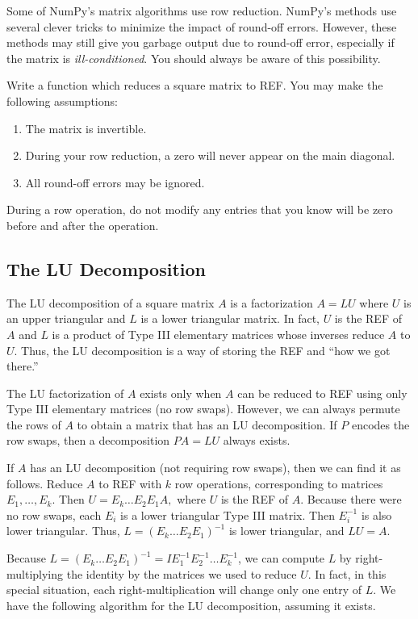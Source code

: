 Some of NumPy's matrix algorithms use row reduction.
NumPy's methods use several clever tricks to minimize the impact of round-off errors.
However, these methods may still give you garbage output due to round-off error, especially if the matrix is \emph{ill-conditioned}.
You should always be aware of this possibility.

\begin{problem}
\label{prob:REF}
Write a function which reduces a square matrix to REF.
You may make the following assumptions:
\begin{enumerate}
\item The matrix is invertible.
\item During your row reduction, a zero will never appear on the main diagonal.
\item All round-off errors may be ignored.
\end{enumerate}
During a row operation, do not modify any entries that you know will be zero before and after the operation.
\end{problem}

\subsection*{The LU Decomposition} %

The LU decomposition of a square matrix $A$ is a factorization $A=LU$ where $U$ is an upper triangular and $L$ is a lower triangular matrix.
In fact, $U$ is the REF of $A$ and $L$ is a product of Type III elementary matrices whose inverses reduce $A$ to $U$.
Thus, the LU decomposition is a way of storing the REF and ``how we got there.''

The LU factorization of $A$ exists only when $A$ can be reduced to REF using only Type III elementary matrices (no row swaps).
However, we can always permute the rows of $A$ to obtain a matrix that has an LU decomposition.
If $P$ encodes the row swaps, then a decomposition $PA = LU$ always exists.

If $A$ has an LU decomposition (not requiring row swaps), then we can find it as follows.
Reduce $A$ to REF with $k$ row operations, corresponding to matrices $E_1, \ldots, E_k$.
Then $U = E_k \ldots E_2E_1A,$ where $U$ is the REF of $A$.
Because there were no row swaps, each $E_i$ is a lower triangular Type III matrix. Then $E_i^{-1}$ is also lower triangular.
Thus, $L=(E_k \ldots E_2E_1)^{-1}$ is lower triangular, and $LU=A.$

Because $L=(E_k \ldots E_2E_1)^{-1} = IE_1^{-1}E_2^{-1}\ldots E_k^{-1}$, we can compute $L$ by right-multiplying the identity by the matrices we used to reduce $U$.
In fact, in this special situation, each right-multiplication will change only one entry of $L$.
We have the following algorithm for the LU decomposition, assuming it exists.

